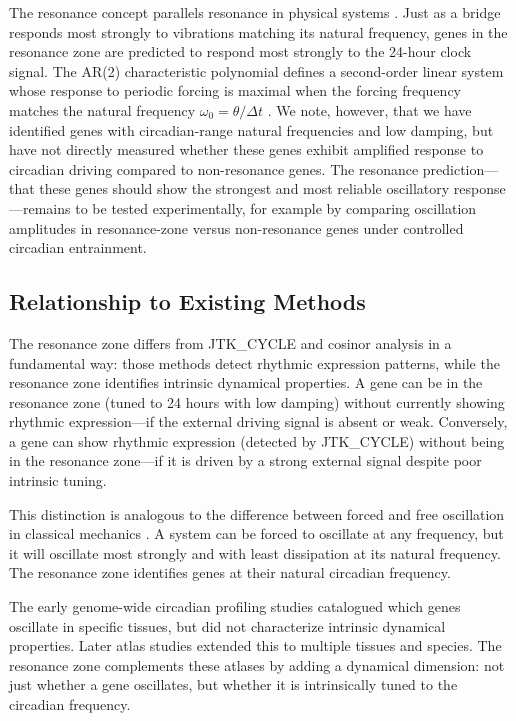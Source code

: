 \documentclass[11pt,letterpaper]{article}
\begin{document}
The resonance concept parallels resonance in physical systems \citep{strogatz2001nonlinear}. Just as a bridge responds most strongly to vibrations matching its natural frequency, genes in the resonance zone are predicted to respond most strongly to the 24-hour clock signal. The AR(2) characteristic polynomial defines a second-order linear system whose response to periodic forcing is maximal when the forcing frequency matches the natural frequency $\omega_0 = \theta / \Delta t$ \citep{hamilton1994time}. We note, however, that we have identified genes with circadian-range natural frequencies and low damping, but have not directly measured whether these genes exhibit amplified response to circadian driving compared to non-resonance genes. The resonance prediction---that these genes should show the strongest and most reliable oscillatory response---remains to be tested experimentally, for example by comparing oscillation amplitudes in resonance-zone versus non-resonance genes under controlled circadian entrainment.

\subsection{Relationship to Existing Methods}

The resonance zone differs from JTK\_CYCLE \citep{hughes2010jtk} and cosinor analysis \citep{cornelissen2014cosinor} in a fundamental way: those methods detect rhythmic expression patterns, while the resonance zone identifies intrinsic dynamical properties. A gene can be in the resonance zone (tuned to 24 hours with low damping) without currently showing rhythmic expression---if the external driving signal is absent or weak. Conversely, a gene can show rhythmic expression (detected by JTK\_CYCLE) without being in the resonance zone---if it is driven by a strong external signal despite poor intrinsic tuning.

This distinction is analogous to the difference between forced and free oscillation in classical mechanics \citep{strogatz2001nonlinear}. A system can be forced to oscillate at any frequency, but it will oscillate most strongly and with least dissipation at its natural frequency. The resonance zone identifies genes at their natural circadian frequency.

The early genome-wide circadian profiling studies \citep{panda2002coordinated, storch2002extensive, ueda2002system} catalogued which genes oscillate in specific tissues, but did not characterize intrinsic dynamical properties. Later atlas studies \citep{zhang2014circadian, mure2018diurnal} extended this to multiple tissues and species. The resonance zone complements these atlases by adding a dynamical dimension: not just whether a gene oscillates, but whether it is intrinsically tuned to the circadian frequency.
\end{document}
